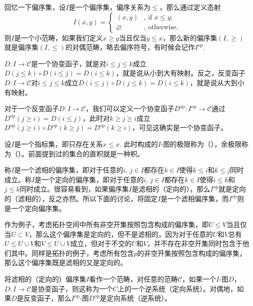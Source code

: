 \para 回忆一下偏序集，设$I$是一个偏序集，偏序关系为$\leq$，那么通过定义态射
\[
	{I}\left(x,y\right)=\begin{cases}
	(x,y)&\text{, if }x\leq y\text{;}\\
	\varnothing&\text{, otherwise}.
	\end{cases}
\]
则$I$是一个小范畴，如果我们定义$x\geq y$当且仅当$y\leq x$，那么新的偏序集$(I,\geq)$就是偏序集$(I,\leq)$的对偶范畴，略去偏序符号，有时候会记作$I^{\mathrm{op}}$.

$D:I\to \mathcal{C}$是一个协变函子，就是对$i\leq j\leq k$成立$D(j\leq k)\circ D(i\leq j)=D(i\leq k)$，就是说从小到大有映射。反之，反变函子$D:I\to \mathcal{C}$对$i\leq j\leq k$成立$D(i\leq j)\circ D(j\leq k)=D(i\leq k)$，就是说从大到小有映射。

对于一个反变函子$D:I\to \mathcal{C}$，我们可以定义一个协变函子$D^{\mathrm{op}} :I^{\mathrm{op}}\to \mathcal{C}$通过$D^{\mathrm{op}}(j\geq i)=D(i\leq j)$，此时对$k\geq j\geq i$成立$D^{\mathrm{op}}(j\geq i)\circ D^{\mathrm{op}}(k\geq j)=D^{\mathrm{op}}(k\geq i)$，可见这确实是一个协变函子。

\para 设$I$是一个指标集，即只存在关系$x\leq x$. 此时构成的$I$-图的极限称为（），余极限称为（）。前面提到过的集合的直积就是一种积。

\para 称$I$是一个滤相的偏序集，即对于任意的$i$, $j\in I$都存在$k\in I$使得$k\leq i$和$k\leq j$同时成立。称$I$是一个定向的偏序集，即对于任意的$i$, $j\in I$都存在$k\in I$使得$i\leq k$和$j\leq k$同时成立。很容易看到，如果偏序集$I$是滤相的（定向的），那么$I^{\mathrm{op}}$就是定向的（滤相的），反之亦然。所以下面的讨论，将固定$I$是一个滤相偏序集，而$I^{\mathrm{op}}$则是一个定向偏序集。

作为例子，考虑拓扑空间中所有非空开集按照包含构成的偏序集，即$U\leq V$当且仅当$U\subset V$，那么这个偏序集是定向的，但不是滤相的，因为对于任意的$U$和$V$总有$U\leq U\cup V$和$V\leq U\cup V$成立，但对于不交的$U$和$V$，并不存在非空开集同时包含于他们其中。同样是拓扑的例子，考虑所有包含$p$的非空开集按照包含构成的偏序集，那么这个偏序集既是滤相的又是定向的。

\para 将滤相的（定向的）偏序集$I$看作一个范畴，对任意的范畴$\mathcal{C}$，如果一个$I$-图$D$，$D:I\to \mathcal{C}$是协变函子，则这称为一个$C$上的一个{逆系统}（{定向系统}）。对偶地，如果$D$是反变函子，那么$I^{\mathrm{op}}$-图$D^{\mathrm{op}}$是定向系统（逆系统）。

